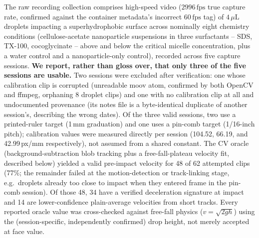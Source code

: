 \documentclass[11pt]{article}
\begin{document}
\begin{center}
\label{fig:data}
\end{center}

The raw recording collection comprises high-speed video ($2996\,\mathrm{fps}$
true capture rate, confirmed against the container metadata's incorrect
$60\,\mathrm{fps}$ tag) of $4\,\mu\mathrm{L}$ droplets impacting a
superhydrophobic surface across nominally eight chemistry conditions
(cellulose-acetate nanoparticle suspensions in three surfactants -- SDS,
TX-100, cocoglycinate -- above and below the critical micelle concentration,
plus a water control and a nanoparticle-only control), recorded across five
capture sessions. \textbf{We report, rather than gloss over, that only three of
the five sessions are usable.} Two sessions were excluded after verification: one
whose calibration clip is corrupted (unreadable moov atom, confirmed by both
OpenCV and ffmpeg, orphaning 8 droplet clips) and one with no calibration clip at
all and undocumented provenance (its notes file is a byte-identical duplicate of
another session's, describing the wrong dates). Of the three valid sessions, two
use a printed-ruler target (1\,mm graduation) and one uses a pin-comb target
(1/16-inch pitch); calibration values were measured directly per session
(104.52, 66.19, and 42.99\,px/mm respectively), not assumed from a shared
constant. The CV oracle (background-subtraction blob tracking plus a
free-fall-plateau velocity fit, described below) yielded a valid pre-impact
velocity for 48 of 62 attempted clips (77\%; the remainder failed at the
motion-detection or track-linking stage, e.g.\ droplets already too close to
impact when they entered frame in the pin-comb session). Of those 48, 34 have a
verified deceleration signature at impact and 14 are lower-confidence
plain-average velocities from short tracks. Every reported oracle value was
cross-checked against free-fall physics ($v=\sqrt{2gh}$) using the (session-specific,
independently confirmed) drop height, not merely accepted at face value.
\end{document}

